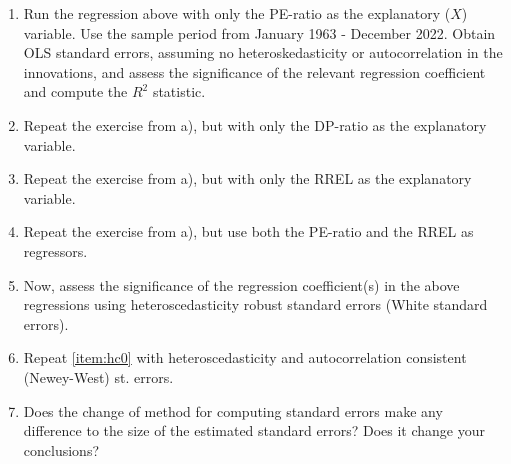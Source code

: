 \documentclass[12pt,twoside]{article}
\begin{document}
\begin{enumerate}[label = \alph*)]
    \item Run the regression above with only the PE-ratio as the explanatory (\(X\)) variable. Use the sample period from January 1963 - December 2022. Obtain OLS standard errors, assuming no heteroskedasticity or autocorrelation in the innovations, and assess the significance of the relevant regression coefficient and compute the \(R^2\) statistic.
    \item Repeat the exercise from a), but with only the DP-ratio as the explanatory variable.
    \item Repeat the exercise from a), but with only the RREL as the explanatory variable.
    \item Repeat the exercise from a), but use both the PE-ratio and the RREL as regressors.
    \item\label{item:hc0} Now, assess the significance of the regression coefficient(s) in the above regressions using heteroscedasticity robust standard errors (White standard errors).
    \item Repeat \ref{item:hc0} with heteroscedasticity and autocorrelation consistent (Newey-West) st. errors.
    \item Does the change of method for computing standard errors make any difference to the size of the estimated standard errors? Does it change your conclusions?
\end{enumerate}

% 
% 
\end{document}
